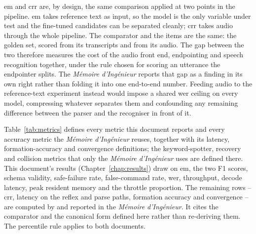 \Gls{em} and \gls{crr} are, by design, the same comparison applied at two points
in the pipeline. \Gls{em} takes reference text as input, so the model is the only variable under
test and the fine-tuned candidates can be separated cleanly; \gls{crr} takes audio
through the whole pipeline. The comparator and the items are the same: the golden set, scored from
its transcripts and from its audio. The gap between the two therefore measures the cost of the audio
front end, endpointing and speech recognition together, under the rule chosen for scoring an
utterance the endpointer splits. The \emph{M\'emoire d'Ing\'enieur} reports that gap as a finding in its own
right rather than folding it into one end-to-end number. Feeding audio to the reference-text
experiment instead would impose a shared \gls{wer} ceiling on every model, compressing whatever
separates them and confounding any remaining difference between the parser and the recogniser in
front of it.

Table~\ref{tab:metrics} defines every metric this document reports and every accuracy metric the
\emph{M\'emoire d'Ing\'enieur} reuses, together with its latency, formation-accuracy and convergence
definitions; the keyword-spotter, recovery and collision metrics that only
the \emph{M\'emoire d'Ing\'enieur} uses are defined there. This document's results
(Chapter~\ref{chap:results}) draw on \gls{em}, the two F1 scores, schema validity, safe-failure
rate, false-command rate, \gls{wer}, throughput, decode latency, peak resident memory and the
throttle proportion. The remaining rows -- \gls{crr}, latency on the reflex and parse
paths, formation accuracy and convergence -- are computed by and reported in the \emph{M\'emoire
d'Ing\'enieur}. It cites the comparator and the canonical form defined here rather than re-deriving
them. The percentile rule applies to both documents.

